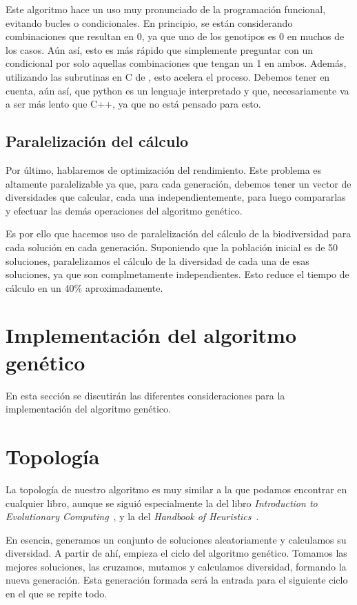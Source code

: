 Este algoritmo hace un uso muy pronunciado de la programación funcional, evitando bucles o condicionales. En principio, se están considerando combinaciones que resultan en 0, ya que uno de los genotipos es 0 en muchos de los casos. Aún así, esto es más rápido que simplemente preguntar con un condicional por solo aquellas combinaciones que tengan un 1 en ambos. Además, utilizando las subrutinas en C de , esto acelera el proceso. Debemos tener en cuenta, aún así, que python es un lenguaje interpretado y que, necesariamente va a ser más lento que C++, ya que no está pensado para esto.


\subsection{Paralelización del cálculo}
Por último, hablaremos de optimización del rendimiento. Este problema es altamente paralelizable ya que, para cada generación, debemos tener un vector de diversidades que calcular, cada una independientemente, para luego compararlas y efectuar las demás operaciones del algoritmo genético.

Es por ello que hacemos uso de paralelización del cálculo de la biodiversidad para cada solución en cada generación. Suponiendo que la población inicial es de 50 soluciones, paralelizamos el cálculo de la diversidad de cada una de esas soluciones, ya que son complmetamente independientes. Esto reduce el tiempo de cálculo en un 40\% aproximadamente. 


\section{Implementación del algoritmo genético}
En esta sección se discutirán las diferentes consideraciones para la implementación del algoritmo genético.

\section{Topología}

La topología de nuestro algoritmo es muy similar a la que podamos encontrar en cualquier libro, aunque se siguió especialmente la del libro \textit{Introduction to Evolutionary Computing}~\cite{evolutionaryEiben}, y la del \textit{Handbook of Heuristics}~\cite{handbookMart}.


En esencia, generamos un conjunto de soluciones aleatoriamente y calculamos su diversidad. A partir de ahí, empieza el ciclo del algoritmo genético. Tomamos las mejores soluciones, las cruzamos, mutamos y calculamos diversidad, formando la nueva generación. Esta generación formada será la entrada para el siguiente ciclo en el que se repite todo.

